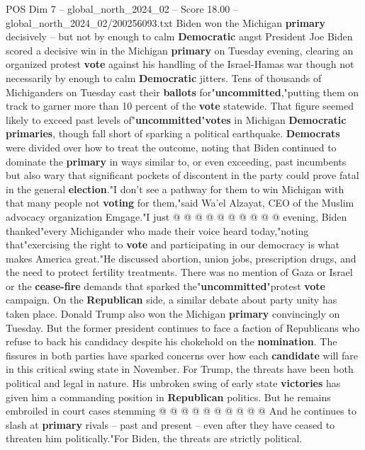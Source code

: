 \begin{textsample}{POS Dim 7 – global\_north\_2024\_02 – Score 18.00 – global\_north\_2024\_02/200256093.txt}  \label{ex:f7_pos_021}
Biden won the Michigan \textbf{primary} decisively -- but not by enough to calm \textbf{Democratic} angst President Joe Biden scored a decisive win in the Michigan \textbf{primary} on Tuesday evening, clearing an organized protest \textbf{vote} against his handling of the Israel-Hamas war though not necessarily by enough to calm \textbf{Democratic} jitters.
Tens of thousands of Michiganders on Tuesday cast their \textbf{ballots} for"\textbf{uncommitted},"putting them on track to garner more than 10 percent of the \textbf{vote} statewide.
That figure seemed likely to exceed past levels of"\textbf{uncommitted}"\textbf{votes} in Michigan \textbf{Democratic} \textbf{primaries}, though fall short of sparking a political earthquake. \textbf{Democrats} were divided over how to treat the outcome, noting that Biden continued to dominate the \textbf{primary} in ways similar to, or even exceeding, past incumbents but also wary that significant pockets of discontent in the party could prove fatal in the general \textbf{election}."I don't see a pathway for them to win Michigan with that many people not \textbf{voting} for them,"said Wa'el Alzayat, CEO of the Muslim advocacy organization Emgage."I just @ @ @ @ @ @ @ @ @ @ evening, Biden thanked"every Michigander who made their voice heard today,"noting that"exercising the right to \textbf{vote} and participating in our democracy is what makes America great."He discussed abortion, union jobs, prescription drugs, and the need to protect fertility treatments.
There was no mention of Gaza or Israel or the \textbf{cease-fire} demands that sparked the"\textbf{uncommitted}"protest \textbf{vote} campaign.
On the \textbf{Republican} side, a similar debate about party unity has taken place.
Donald Trump also won the Michigan \textbf{primary} convincingly on Tuesday.
But the former president continues to face a faction of Republicans who refuse to back his candidacy despite his chokehold on the \textbf{nomination}.
The fissures in both parties have sparked concerns over how each \textbf{candidate} will fare in this critical swing state in November.
For Trump, the threats have been both political and legal in nature.
His unbroken swing of early state \textbf{victories} has given him a commanding position in \textbf{Republican} politics.
But he remains embroiled in court cases stemming @ @ @ @ @ @ @ @ @ @ And he continues to slash at \textbf{primary} rivals -- past and present -- even after they have ceased to threaten him politically."For Biden, the threats are strictly political.

\end{textsample}
